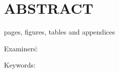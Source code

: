 \section*{ABSTRACT}

\begin{doublespace}

\thesisschool


\thesisauthor

\textbf{\thesistitle}

\thesissubject

\currentyear

 pages,  figures,  tables and 
appendices

\begin{tabbing}
Examiners:\quad\= \thesisfirstexaminer\\
\> \thesissecondexaminer
\end{tabbing}

Keywords: \thesiskeywords
\end{doublespace}

\vspace*{1em}
